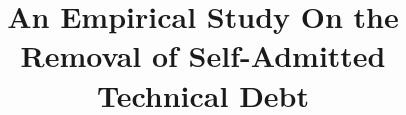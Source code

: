 \documentclass[10pt, conference]{IEEEtran}
\begin{document}
\title{An Empirical Study On the Removal of Self-Admitted Technical Debt}
\author{
}
\end{document}
